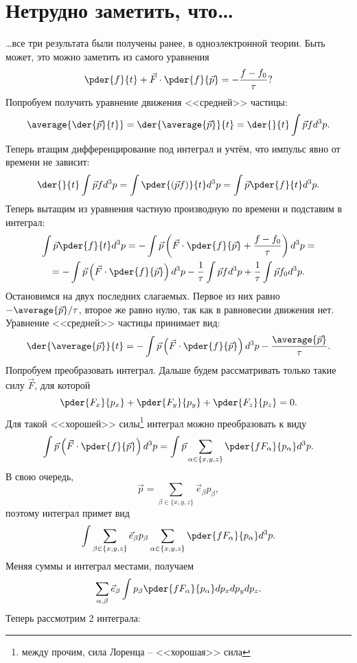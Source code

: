 \section{Нетрудно заметить, что\ldots}
\ldots все три результата были получены ранее, в одноэлектронной теории. Быть
может, это можно заметить из самого уравнения
\[
    \pder{f}{t} + \vec{F}\cdot\pder{f}{\vec{p}} = -\frac{f-f_0}{\tau}?
\]
Попробуем получить уравнение движения <<средней>> частицы:
\[
    \average{\der{\vec{p}}{t}} = \der{\average{\vec{p}}}{t} =
    \der{}{t}\int\vec{p} f d^3p.
\]
Теперь втащим дифференцирование под интеграл и учтём, что импульс явно от
времени не зависит:
\[
    \der{}{t}\int\vec{p} f d^3p = \int\pder{(\vec{p} f)}{t} d^3p =
    \int\vec{p}\pder{f}{t} d^3p.
\]
Теперь вытащим из уравнения частную производную по времени и подставим в
интеграл:
\begin{gather*}
    \int\vec{p}\pder{f}{t} d^3p = -\int\vec{p}
    \left(\vec{F}\cdot\pder{f}{\vec{p}} + \frac{f-f_0}{\tau}\right)d^3p = \\ =
    -\int\vec{p}\left(\vec{F}\cdot\pder{f}{\vec{p}}\right)d^3p
    -\frac{1}{\tau}\int\vec{p}fd^3p + \frac{1}{\tau}\int\vec{p}f_0d^3p.
\end{gather*}
Остановимся на двух последних слагаемых. Первое из них равно
\( -\average{\vec{p}}/\tau \), второе же равно нулю, так как в равновесии
движения нет. Уравнение <<средней>> частицы принимает вид:
\[
    \der{\average{\vec{p}}}{t} =
    -\int\vec{p}\left(\vec{F}\cdot\pder{f}{\vec{p}}\right)d^3p
    -\frac{\average{\vec{p}}}{\tau}.
\]
Попробуем преобразовать интеграл. Дальше будем рассматривать только такие силу
\( \vec{F} \), для которой
\[
    \pder{F_x}{p_x} + \pder{F_y}{p_y} + \pder{F_z}{p_z} = 0.
\]
Для такой <<хорошей>> силы\footnote{между прочим, сила Лоренца -- <<хорошая>>
сила} интеграл можно преобразовать к виду
\[
    \int\vec{p}\left(\vec{F}\cdot\pder{f}{\vec{p}}\right)d^3p =
    \int\vec{p}\sum_{\alpha\in\{x,y,z\}}\pder{fF_\alpha}{p_\alpha}d^3p.
\]
В свою очередь,
\[
    \vec{p} = \sum_{\beta\in\{x,y,z\}}\vec{e}_\beta p_\beta,
\]
поэтому интеграл примет вид
\[
    \int\sum_{\beta\in\{x,y,z\}}\vec{e}_\beta p_\beta
    \sum_{\alpha\in\{x,y,z\}}\pder{fF_\alpha}{p_\alpha}d^3p.
\]
Меняя суммы и интеграл местами, получаем
\[
    \sum_{\alpha,\beta}\vec{e}_\beta \int p_\beta \pder{fF_\alpha}{p_\alpha}
    dp_xdp_ydp_z.
\]
Теперь рассмотрим 2 интеграла:
